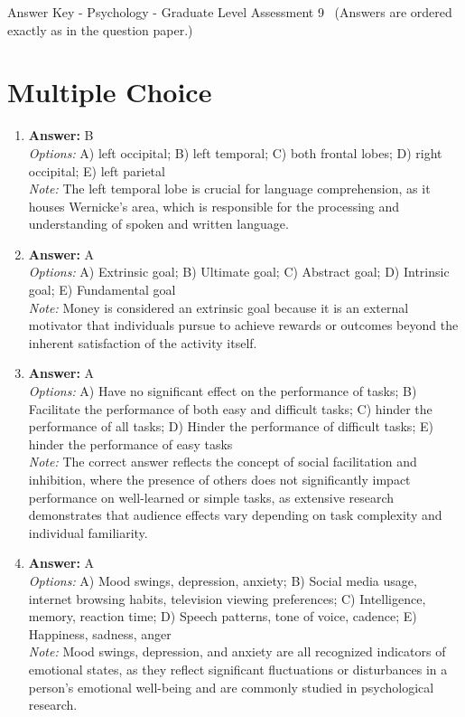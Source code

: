 \documentclass[12pt]{article}
\begin{document}
\begin{center}
Answer Key - Psychology - Graduate Level Assessment 9 \
\small (Answers are ordered exactly as in the question paper.)
\end{center}

\section*{Multiple Choice}
\begin{enumerate}[label=\arabic*.]
\item \textbf{Answer:} B
\\ \textit{Options:} A) left occipital; B) left temporal; C) both frontal lobes; D) right occipital; E) left parietal
\\ \textit{Note:} The left temporal lobe is crucial for language comprehension, as it houses Wernicke's area, which is responsible for the processing and understanding of spoken and written language.
\item \textbf{Answer:} A
\\ \textit{Options:} A) Extrinsic goal; B) Ultimate goal; C) Abstract goal; D) Intrinsic goal; E) Fundamental goal
\\ \textit{Note:} Money is considered an extrinsic goal because it is an external motivator that individuals pursue to achieve rewards or outcomes beyond the inherent satisfaction of the activity itself.
\item \textbf{Answer:} A
\\ \textit{Options:} A) Have no significant effect on the performance of tasks; B) Facilitate the performance of both easy and difficult tasks; C) hinder the performance of all tasks; D) Hinder the performance of difficult tasks; E) hinder the performance of easy tasks
\\ \textit{Note:} The correct answer reflects the concept of social facilitation and inhibition, where the presence of others does not significantly impact performance on well-learned or simple tasks, as extensive research demonstrates that audience effects vary depending on task complexity and individual familiarity.
\item \textbf{Answer:} A
\\ \textit{Options:} A) Mood swings, depression, anxiety; B) Social media usage, internet browsing habits, television viewing preferences; C) Intelligence, memory, reaction time; D) Speech patterns, tone of voice, cadence; E) Happiness, sadness, anger
\\ \textit{Note:} Mood swings, depression, and anxiety are all recognized indicators of emotional states, as they reflect significant fluctuations or disturbances in a person's emotional well-being and are commonly studied in psychological research.

\end{enumerate}
\end{document}
